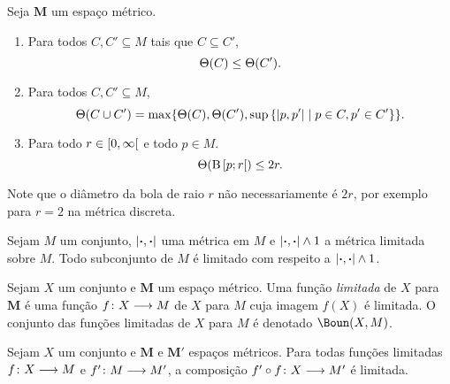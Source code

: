 \begin{exercise}
Seja $\bm M$ um espaço métrico.
	\begin{enumerate}
	\item Para todos $C,C' \subseteq M$ tais que $C \subseteq C'$,
		\begin{equation*}
		\Theta(C) \leq \Theta (C').
		\end{equation*}

	\item Para todos $C, C' \subseteq M$,
		\begin{equation*}
		\Theta(C \cup C') = \max \{ \Theta(C),\Theta(C'),\sup\left\{{\left\vert{p},{p'}\right\vert}\;\middle\vert\;{p \in C, p' \in C'}\right\} \}.
		\end{equation*}


	\item Para todo $r \in \left[{0},{\infty}\right[$ e todo $p \in M$.
	\begin{equation*}
	\Theta(\mathrm{B}\left[{p};{r}\right[) \leq 2r.
	\end{equation*}
	\end{enumerate}
\end{exercise}

Note que o diâmetro da bola de raio $r$ não necessariamente é $2r$, por exemplo para $r=2$ na métrica discreta.

\begin{exercise}
Sejam $M$ um conjunto, $\left\vert{\bm{\cdot}},{\bm{\cdot}}\right\vert$ uma métrica em $M$ e $\left\vert{\bm{\cdot}},{\bm{\cdot}}\right\vert \mathbin{\wedge} 1$ a métrica limitada sobre $M$. Todo subconjunto de $M$ é limitado com respeito a $\left\vert{\bm{\cdot}},{\bm{\cdot}}\right\vert \mathbin{\wedge} 1$.
\end{exercise}

\begin{definition}
Sejam $X$ um conjunto e $\bm M$ um espaço métrico. Uma função \emph{limitada} de $X$ para $\bm M$ é uma função ${f}\colon {X} \longrightarrow {M}$ de $X$ para $M$ cuja imagem $f(X)$ é limitada.
O conjunto das funções limitadas de $X$ para $M$ é denotado $\Boun(X,M)$.
\end{definition}

\begin{exercise}
Sejam $X$ um conjunto e $\bm M$ e $\bm M'$ espaços métricos. Para todas funções limitadas ${f}\colon {X} \longrightarrow {M}$ e ${f'}\colon {M} \longrightarrow {M'}$, a composição ${f' \circ f}\colon {X} \longrightarrow {M'}$ é limitada.
\end{exercise}



